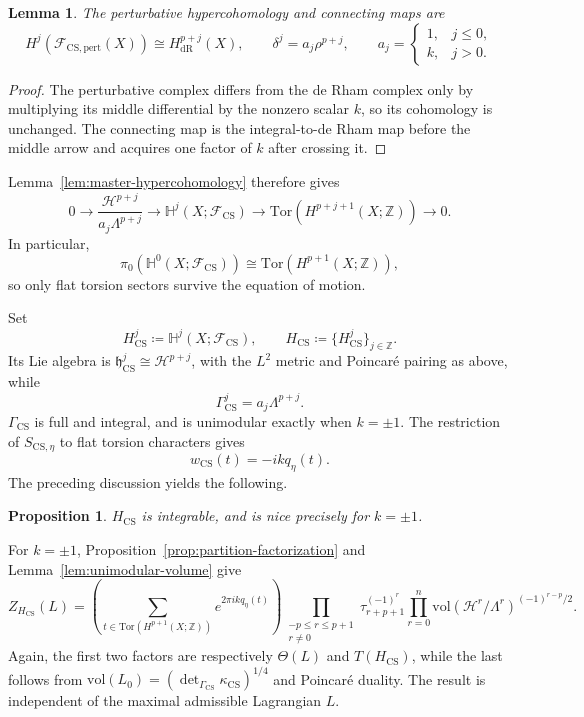 \documentclass[12pt]{amsart}
\numberwithin{table}{section}
\numberwithin{equation}{section}
\newtheorem{lem}{Lemma}[section]
\newtheorem{prop}{Proposition}[section]
\theoremstyle{plain}
\newcommand{\fh}{\mathfrak{h}}
\newcommand{\sF}{\mathcal{F}}
\newcommand{\sH}{\mathcal{H}}
\newcommand{\Hq}{\mathbb{H}}
\newcommand{\Z}{\mathbb{Z}}
\newcommand{\Tor}{\mathrm{Tor}}
\newcommand{\vol}{\mathrm{vol}}
\begin{document}
\begin{lem}\label{lem:CS-cohomology}
The perturbative hypercohomology and connecting maps are
\[
H^j(\sF_{\mathrm{CS},\mathrm{pert}}(X))\cong H^{p+j}_{\mathrm{dR}}(X),
\qquad
\delta^j=a_j\rho^{p+j},
\qquad
a_j=\begin{cases}1,&j\le0,\\ k,&j>0.\end{cases}
\]
\end{lem}
\begin{proof}
The perturbative complex differs from the de Rham complex only by multiplying its middle differential by the nonzero scalar $k$, so its cohomology is unchanged. The connecting map is the integral-to-de Rham map before the middle arrow and acquires one factor of $k$ after crossing it.
\end{proof}

Lemma~\ref{lem:master-hypercohomology} therefore gives
\begin{equation}\label{eq:CS-H}
0\longrightarrow
\frac{\mathcal H^{p+j}}{a_j\Lambda^{p+j}}
\longrightarrow
\Hq^j(X;\sF_{\mathrm{CS}})
\longrightarrow
\Tor \left( H^{p+j+1}(X;\Z)\right)
\longrightarrow0.
\end{equation}
In particular,
\[
\pi_0(\Hq^0(X;\sF_{\mathrm{CS}}))\cong\Tor \left( H^{p+1}(X;\Z) \right),
\]
so only flat torsion sectors survive the equation of motion.

Set
\[
H_{\mathrm{CS}}^j\coloneq\mathbb H^j(X;\sF_{\mathrm{CS}}),
\qquad H_{\mathrm{CS}}\coloneq\{H_{\mathrm{CS}}^j\}_{j\in\Z}.
\]
Its Lie algebra is $\fh_{\mathrm{CS}}^j\cong\mathcal H^{p+j}$, with the $L^2$ metric and Poincar\'e pairing as above, while
\[
\Gamma_{\mathrm{CS}}^j=a_j\Lambda^{p+j}.
\]
$\Gamma_{\mathrm{CS}}$ is full and integral, and is unimodular exactly when $k = \pm 1$. The restriction of $S_{\mathrm{CS},\eta}$ to flat torsion characters gives 
\[
w_{\mathrm{CS}}(t)=-ikq_\eta(t).
\]
The preceding discussion yields the following.
\begin{prop}
	$H_{\mathrm{CS}}$ is integrable, and is nice precisely for $k=\pm1$.
\end{prop}

For $k=\pm1$, Proposition~\ref{prop:partition-factorization} and Lemma~\ref{lem:unimodular-volume} give
\begin{equation}\label{eq:CS-partition}
Z_{H_{\mathrm{CS}}}(L)
=
\left(\sum_{t\in\Tor \left(H^{p+1}(X;\Z)\right)}e^{2\pi i k q_\eta(t)}\right)
\prod_{\substack{-p\leq r\leq p+1\\r\neq0}}
\tau_{r+p+1}^{(-1)^r}
\prod_{r=0}^{n}\vol(\sH^r/\Lambda^r)^{(-1)^{r-p}/2}.
\end{equation}
Again, the first two factors are respectively $\Theta(L)$ and $T(H_{\mathrm{CS}})$, while the last follows from
$\vol(L_0)=({\det}_{\Gamma_{\mathrm{CS}}}\kappa_{\mathrm{CS}})^{1/4}$ and Poincar\'e duality. The result is independent of the maximal admissible Lagrangian $L$.
\end{document}
